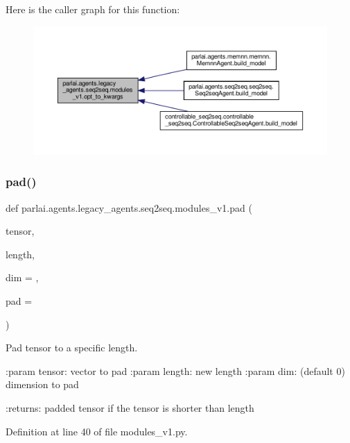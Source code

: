 Here is the caller graph for this function\+:
\nopagebreak
\begin{figure}[H]
\begin{center}
\leavevmode
\includegraphics[width=350pt]{namespaceparlai_1_1agents_1_1legacy__agents_1_1seq2seq_1_1modules__v1_af13e3733abb5828b0c0a75d95833441c_icgraph}
\end{center}
\end{figure}
\mbox{\label{namespaceparlai_1_1agents_1_1legacy__agents_1_1seq2seq_1_1modules__v1_ab71a48e82c903a3a22ff0b000c461922}} 
\subsubsection{\texorpdfstring{pad()}{pad()}}
{\footnotesize\ttfamily def parlai.\+agents.\+legacy\+\_\+agents.\+seq2seq.\+modules\+\_\+v1.\+pad (\begin{DoxyParamCaption}\item[{}]{tensor,  }\item[{}]{length,  }\item[{}]{dim = {},  }\item[{}]{pad = {} }\end{DoxyParamCaption})}

\begin{DoxyVerb}Pad tensor to a specific length.

:param tensor: vector to pad
:param length: new length
:param dim: (default 0) dimension to pad

:returns: padded tensor if the tensor is shorter than length
\end{DoxyVerb}
 

Definition at line 40 of file modules\+\_\+v1.\+py.

